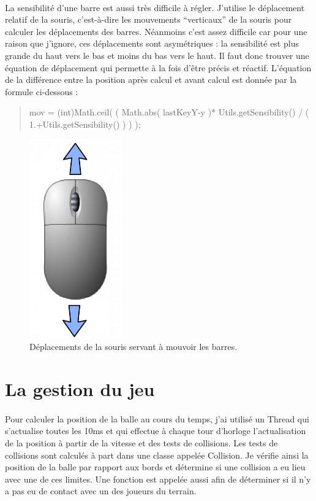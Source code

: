\documentclass[a4paper,12pt]{report}
\begin{document}
\paragraph{}
La sensibilité d'une barre est aussi très difficile à régler. J'utilise le déplacement relatif de la souris, c'est-à-dire les mouvements \enquote{verticaux} de la souris pour calculer les déplacements des barres. Néanmoins c'est assez difficile car pour une raison que j'ignore, ces déplacements sont asymétriques : la sensibilité est plus grande du haut vers le bas et moins du bas vers le haut. Il faut donc trouver une équation de déplacement qui permette à la fois d'être précis et réactif. L'équation de la différence entre la position après calcul et avant calcul est donnée par la formule ci-dessous :
\begin{quote}
mov = (int)Math.ceil( ( Math.abs( lastKeyY-y )* Utils.getSensibility() / ( 1.+Utils.getSensibility() ) ) );
\end{quote}
\begin{figure}[H]
	\begin{center}
	\includegraphics[width=4cm]{pictures/mouse.png} 
	\end{center}
	\caption{Déplacements de la souris servant à mouvoir les barres.}
    \end{figure}
\section{La gestion du jeu}
\paragraph{}
Pour calculer la position de la balle au cours du temps, j'ai utilisé un Thread qui s'actualise toutes les 10ms et qui effectue à chaque tour d'horloge
l'actualisation de la position à partir de la vitesse et des tests de collisions. Les tests de collisions sont calculés à part dans une classe appelée Collision.
Je vérifie ainsi la position de la balle par rapport aux bords et détermine si une collision a eu lieu avec une de ces limites. Une fonction est appelée aussi afin de
déterminer si il n'y a pas eu de contact avec un des joueurs du terrain.
\end{document}
